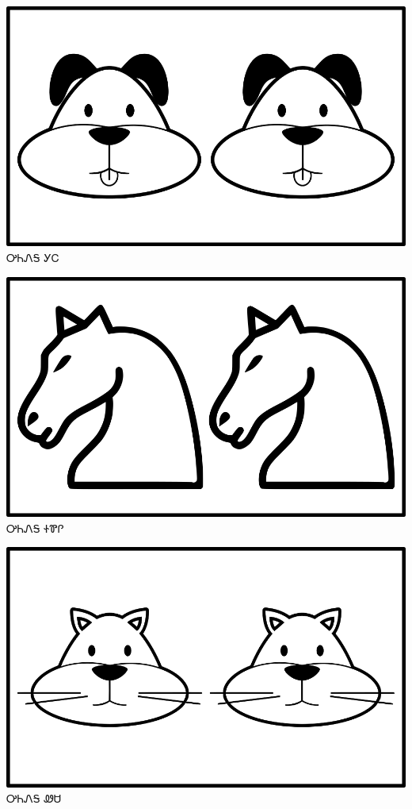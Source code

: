 \documentclass[avery5371]{flashcards}%
\begin{document}
\begin{flashcard}{
\includegraphics[width=0.95\columnwidth,height=.51\columnwidth,keepaspectratio]{../artwork/objects-animate/anitali-gihli}
}\Huge ᎤᏂᏁᎦ ᎩᏟ
\end{flashcard}

\begin{flashcard}{
\includegraphics[width=0.95\columnwidth,height=.51\columnwidth,keepaspectratio]{../artwork/objects-animate/anitali-soquili}
}\Huge ᎤᏂᏁᎦ ᏐᏈᎵ
\end{flashcard}

\begin{flashcard}{
\includegraphics[width=0.95\columnwidth,height=.51\columnwidth,keepaspectratio]{../artwork/objects-animate/anitali-wesa}
}\Huge ᎤᏂᏁᎦ ᏪᏌ
\end{flashcard}
\end{document}
